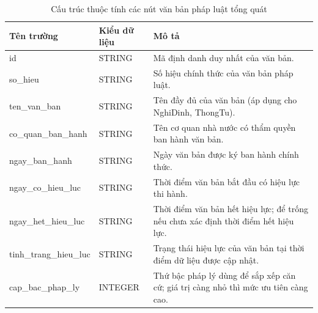 \documentclass[../DoAn.tex]{subfiles}
\begin{document}
\begin{table}[H]
\centering
\footnotesize
\begin{tabularx}{\textwidth}{|>{\raggedright\arraybackslash}p{3.1cm}|>{\raggedright\arraybackslash}p{2.1cm}|>{\raggedright\arraybackslash}X|}
\hline
\textbf{Tên trường} & \textbf{Kiểu dữ liệu} & \textbf{Mô tả} \\ \hline
id & STRING & Mã định danh duy nhất của văn bản. \\ \hline
so\_\allowbreak hieu & STRING & Số hiệu chính thức của văn bản pháp luật. \\ \hline
ten\_\allowbreak van\_\allowbreak ban & STRING & Tên đầy đủ của văn bản (áp dụng cho NghiDinh, ThongTu). \\ \hline
co\_\allowbreak quan\_\allowbreak ban\_\allowbreak hanh & STRING & Tên cơ quan nhà nước có thẩm quyền ban hành văn bản. \\ \hline
ngay\_\allowbreak ban\_\allowbreak hanh & STRING & Ngày văn bản được ký ban hành chính thức. \\ \hline
ngay\_\allowbreak co\_\allowbreak hieu\_\allowbreak luc & STRING & Thời điểm văn bản bắt đầu có hiệu lực thi hành. \\ \hline
ngay\_\allowbreak het\_\allowbreak hieu\_\allowbreak luc & STRING & Thời điểm văn bản hết hiệu lực; để trống nếu chưa xác định thời điểm hết hiệu lực. \\ \hline
tinh\_\allowbreak trang\_\allowbreak hieu\_\allowbreak luc & STRING & Trạng thái hiệu lực của văn bản tại thời điểm dữ liệu được cập nhật. \\ \hline
cap\_\allowbreak bac\_\allowbreak phap\_\allowbreak ly & INTEGER & Thứ bậc pháp lý dùng để sắp xếp căn cứ; giá trị càng nhỏ thì mức ưu tiên càng cao. \\ \hline
\end{tabularx}
\caption{Cấu trúc thuộc tính các nút văn bản pháp luật tổng quát}
\label{tab:kg_van_ban_properties}
\end{table}
\end{document}
